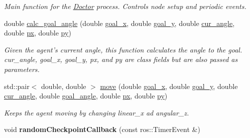\begin{DoxyCompactItemize}
\begin{DoxyCompactList}\small\item\em Main function for the \hyperlink{classDoctor}{Doctor} process. Controls node setup and periodic events. \end{DoxyCompactList}\item 
double \hyperlink{classDoctor_a55fe6c06a3ce07fd9014a03000df43db}{calc\-\_\-goal\-\_\-angle} (double \hyperlink{classDoctor_ae058c3d6dce31d71ac4e63e3fd653275}{goal\-\_\-x}, double \hyperlink{classDoctor_aba0c1163551f144834fc0d68c556fac2}{goal\-\_\-y}, double \hyperlink{classDoctor_ab67e7a3eab1a57a0cfa52d84fe52414d}{cur\-\_\-angle}, double \hyperlink{classDoctor_a6ea729b1a8fc6d33176d768ef62b0a43}{px}, double \hyperlink{classDoctor_a04b4b5bddd2b99b6eb4b7b8813eeeebf}{py})
\begin{DoxyCompactList}\small\item\em Given the agent's current angle, this function calculates the angle to the goal. cur\-\_\-angle, goal\-\_\-x, goal\-\_\-y, px, and py are class fields but are also passed as parameters. \end{DoxyCompactList}\item 
std\-::pair$<$ double, double $>$ \hyperlink{classDoctor_ada60bb6625be46966ff86f7af9d05366}{move} (double \hyperlink{classDoctor_ae058c3d6dce31d71ac4e63e3fd653275}{goal\-\_\-x}, double \hyperlink{classDoctor_aba0c1163551f144834fc0d68c556fac2}{goal\-\_\-y}, double \hyperlink{classDoctor_ab67e7a3eab1a57a0cfa52d84fe52414d}{cur\-\_\-angle}, double \hyperlink{classDoctor_a27377808d49670322af2ce4ec34730f1}{goal\-\_\-angle}, double \hyperlink{classDoctor_a6ea729b1a8fc6d33176d768ef62b0a43}{px}, double \hyperlink{classDoctor_a04b4b5bddd2b99b6eb4b7b8813eeeebf}{py})
\begin{DoxyCompactList}\small\item\em Keeps the agent moving by changing linear\-\_\-x ad angular\-\_\-z. \end{DoxyCompactList}\item 
\hypertarget{classDoctor_a21ac6188dd7f5890ff1a633cf700144d}{void {\bfseries random\-Checkpoint\-Callback} (const ros\-::\-Timer\-Event \&)}\label{classDoctor_a21ac6188dd7f5890ff1a633cf700144d}


\end{DoxyCompactItemize}
